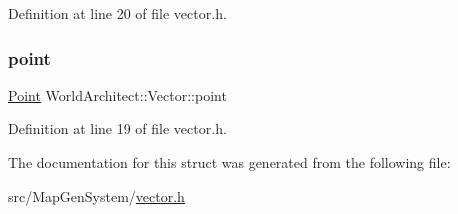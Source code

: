 Definition at line 20 of file vector.\+h.

\mbox{\label{struct_world_architect_1_1_vector_a4024cdb2b1762318504be5d4872aa740}} 
\subsubsection{\texorpdfstring{point}{point}}
{\footnotesize\ttfamily \mbox{\hyperlink{namespace_world_architect_afe984ab247ed2917d3a738c7d83d33ca}{Point}} World\+Architect\+::\+Vector\+::point}



Definition at line 19 of file vector.\+h.



The documentation for this struct was generated from the following file\+:\begin{DoxyCompactItemize}
\item 
src/\+Map\+Gen\+System/\mbox{\hyperlink{vector_8h}{vector.\+h}}\end{DoxyCompactItemize}
